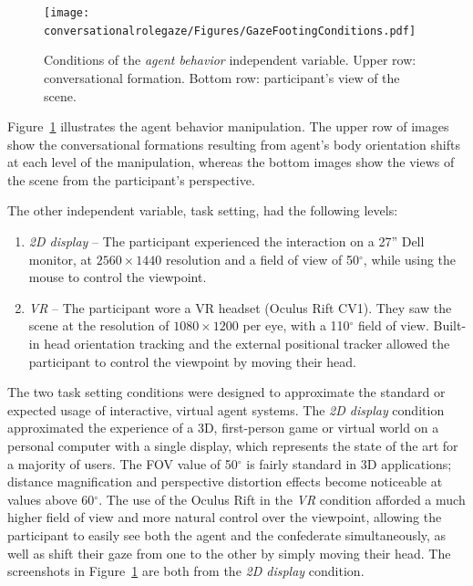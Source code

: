 \begin{figure}
\centering
\texttt{[image: conversationalrolegaze/Figures/GazeFootingConditions.pdf]}
\caption{Conditions of the \emph{agent behavior} independent variable. Upper row: conversational formation. Bottom row: participant's view of the scene.}
\label{fig:GazeFootingConditions}
\end{figure}

Figure~\ref{fig:GazeFootingConditions} illustrates the agent behavior manipulation. The upper row of images show the conversational formations resulting from agent's body orientation shifts at each level of the manipulation, whereas the bottom images show the views of the scene from the participant's perspective.

The other independent variable, task setting, had the following levels:

\begin{enumerate}
\item \emph{2D display} -- The participant experienced the interaction on a 27'' Dell monitor, at $2560 \times 1440$ resolution and a field of view of 50$^\circ$, while using the mouse to control the viewpoint.
\item \emph{VR} -- The participant wore a VR headset (Oculus Rift CV1). They saw the scene at the resolution of $1080 \times 1200$ per eye, with a 110$^\circ$ field of view. Built-in head orientation tracking and the external positional tracker allowed the participant to control the viewpoint by moving their head.
\end{enumerate}

The two task setting conditions were designed to approximate the standard or expected usage of interactive, virtual agent systems. The \emph{2D display} condition approximated the experience of a 3D, first-person game or virtual world on a personal computer with a single display, which represents the state of the art for a majority of users. The FOV value of 50$^\circ$ is fairly standard in 3D applications; distance magnification and perspective distortion effects become noticeable at values above 60$^\circ$. The use of the Oculus Rift in the \emph{VR} condition afforded a much higher field of view and more natural control over the viewpoint, allowing the participant to easily see both the agent and the confederate simultaneously, as well as shift their gaze from one to the other by simply moving their head. The screenshots in Figure~\ref{fig:GazeFootingConditions} are both from the \emph{2D display} condition.

